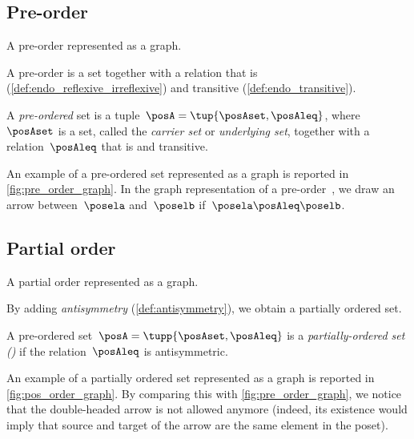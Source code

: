 
\vspace{2cm}

\subsection{Pre-order}
\begin{marginfigure}
    \centering
    \caption{A pre-order represented as a graph.}
    \label{fig:pre_order_graph}
\end{marginfigure}

A pre-order is a set together with a relation that is  (\cref{def:endo_reflexive_irreflexive}) and transitive (\cref{def:endo_transitive}).
\begin{ctdefinition}
    \label{def:preorder}
    A \emph{pre-ordered} set is a tuple~$\posA = \tup{\posAset,\posAleq}$, where~$\posAset$ is a set, called the \emph{carrier set} or \emph{underlying set}, together with a relation~$\posAleq$ that is
     and transitive.
\end{ctdefinition}
An example of a pre-ordered set represented as a graph is reported in \cref{fig:pre_order_graph}.
In the graph representation of a pre-order~\posA, we draw an arrow between~$\posela$ and~$\poselb$ if~$\posela \posAleq \poselb$.

\vfill

\subsection{Partial order}

\begin{marginfigure}
    \centering
    \caption{A partial order represented as a graph.}
    \label{fig:pos_order_graph}
\end{marginfigure}
By adding \emph{antisymmetry} (\cref{def:antisymmetry}), we obtain a partially ordered set.

\begin{ctdefinition}
    \label{def:poset}
    A pre-ordered set~$\posA = \tupp{\posAset,\posAleq}$ is a \emph{partially-ordered set ()} if the relation~$\posAleq$ is antisymmetric.
\end{ctdefinition}

An example of a partially ordered set represented as a graph is reported in \cref{fig:pos_order_graph}.
By comparing this with \cref{fig:pre_order_graph}, we notice that the double-headed arrow is not allowed anymore (indeed, its existence would imply that source and target of the arrow are the same element in the poset).

